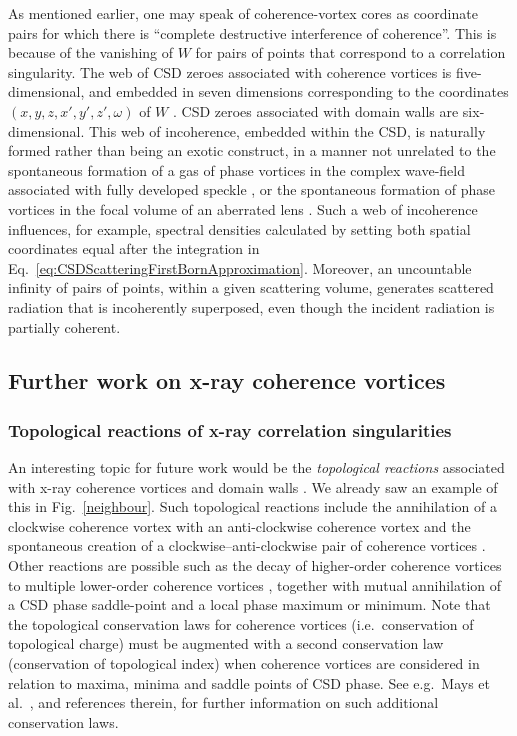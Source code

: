 \documentclass[%
 reprint,
 amsmath,amssymb,
 aps,
]{revtex4-1}
\begin{document}
As mentioned earlier, one may speak of coherence-vortex cores as coordinate pairs for which there is ``complete destructive interference of coherence''. This is because of the vanishing of $W$ for pairs of points that correspond to a correlation singularity.  The web of CSD zeroes  associated with coherence vortices is five-dimensional, and embedded in seven dimensions corresponding to the coordinates $(x,y,z,x',y',z',\omega)$ of $W$ \cite{Marasinghe2010}. CSD zeroes associated with domain walls are six-dimensional.  This web of incoherence, embedded within the CSD, is naturally formed rather than being an exotic construct, in a manner not unrelated to the spontaneous formation of a gas of phase vortices in the complex wave-field associated with fully developed speckle \cite{OHolleran2008}, or the spontaneous formation of phase vortices in the focal volume of an aberrated lens \cite{BoivinDowWolf1967}.  Such a web of incoherence influences, for example, spectral densities calculated by setting both spatial coordinates equal after the integration in Eq.~\ref{eq:CSDScatteringFirstBornApproximation}.  Moreover, an uncountable infinity of pairs of points, within a given scattering volume, generates scattered radiation that is incoherently superposed, even though the incident radiation is partially coherent.

\subsection{Further work on x-ray coherence vortices}\label{subsec:Discussion-part-3}

\subsubsection{Topological reactions of x-ray correlation singularities} 

An interesting topic for future work would be the {\em topological reactions} associated with x-ray coherence vortices and domain walls  \cite{GburSPIE,TopologicalReactionsCohVortices,Marasinghe2010}.  We already saw an example of this in Fig.~\ref{neighbour}.  Such topological reactions include the annihilation of a clockwise coherence vortex with an anti-clockwise coherence vortex and the spontaneous creation of a clockwise--anti-clockwise pair of coherence vortices \cite{TopologicalReactionsCohVortices}.  Other reactions are possible such as the decay of higher-order coherence vortices to multiple lower-order coherence vortices \cite{TopologicalReactionsCohVortices}, together with mutual annihilation of a CSD phase saddle-point and a local phase maximum or minimum.  Note that the topological conservation laws for coherence vortices (i.e.~conservation of topological charge) must be augmented with a second conservation law (conservation of topological index) when coherence vortices are considered in relation to maxima, minima and saddle points of CSD phase.  See e.g.~Mays et al.~\cite{MaysPonsaingPaganin2018}, and references therein, for further information on such additional conservation laws. 
\end{document}
